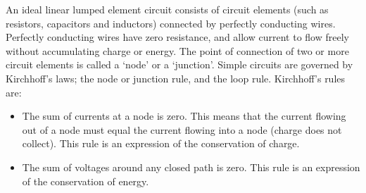 \documentclass[12pt]{article}
\begin{document}
\begin{flushleft}
An ideal linear lumped element circuit consists of circuit elements (such as resistors, capacitors and inductors) connected by perfectly conducting wires.  Perfectly conducting wires have zero resistance, and allow current to flow freely without accumulating charge or energy.  The point of connection of two or more circuit elements is called a `node' or a `junction'.  Simple circuits are governed by Kirchhoff's laws; the node or junction rule, and the loop rule.  Kirchhoff's rules are:

\begin{itemize}
\item The sum of currents at a node is zero.  This means that the current flowing out of a node must equal the current flowing into a node (charge does not collect).  This rule is an expression of the conservation of charge.
\item The sum of voltages around any closed path is zero.  This rule is an expression of the conservation of energy.
\end{itemize}

\end{flushleft}
\end{document}
